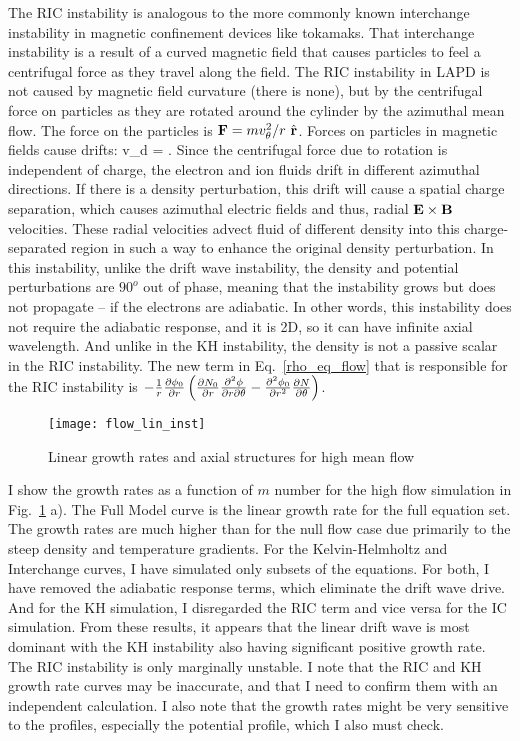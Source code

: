 The RIC instability is analogous to the more commonly known interchange instability in magnetic confinement devices like tokamaks. That interchange instability is a result of a curved magnetic
field that causes particles to feel a centrifugal force as they travel along the field. The RIC instability in LAPD is not caused by magnetic field curvature (there is none), but by the
centrifugal force on particles as they are rotated around the cylinder by the azimuthal mean flow. 
The force on the particles is ${\bf F} = m v_\theta^2/r \ \hat{{\bf r}}$. Forces on particles in magnetic fields cause drifts:
\beq
\label{force_drift}
v_d =  .
\eeq
Since the centrifugal force due to rotation is independent of charge, the electron and ion fluids drift in different azimuthal directions. If there is a density perturbation, this drift will cause
a spatial charge separation, which causes azimuthal electric fields and thus, radial ${\bf E \times B}$ velocities. 
These radial velocities advect fluid of different density into this charge-separated region in such a way to enhance the original density perturbation. In this instability, unlike the drift wave
instability, the density and potential perturbations are $90^o$ out of phase, meaning that the instability grows but does not propagate -- if the electrons are adiabatic. In other words,
this instability does not require the adiabatic response, and it is 2D, so it can have infinite axial wavelength. And unlike in the KH instability, the density is not a passive scalar in the
RIC instability. The new term in Eq.~\ref{rho_eq_flow} that is responsible
for the RIC instability is $-\frac{1}{r} \frac{\partial\phi_0}{\partial r} \left(\frac{\partial N_0}{\partial r} \frac{\partial^2\phi}{\partial r \partial\theta} - \frac{\partial^2\phi_0}{\partial r^2} \frac{\partial N}{\partial\theta} \right)$.

\begin{figure}
\centerline{\texttt{[image: flow\_lin\_inst]}}
\caption{Linear growth rates and axial structures for high mean flow}
\label{flow_lin_inst}
\end{figure}

I show the growth rates as a function of $m$ number for the high flow simulation in Fig.~\ref{flow_lin_inst} a). The Full Model curve is the linear growth rate
for the full equation set. The growth rates are much higher than for the null flow case due primarily to the steep density and temperature gradients. For the Kelvin-Helmholtz and Interchange
curves, I have simulated only subsets of the equations. For both, I have removed the adiabatic response terms, which eliminate the drift wave drive. And for the KH simulation, I disregarded
the RIC term and vice versa for the IC simulation. From these results, it appears that the linear drift wave is most dominant with the KH instability also having significant positive growth
rate. The RIC instability is only marginally unstable. I note that the RIC and KH growth rate curves may be inaccurate, and that I need to confirm them with an independent calculation.
I also note that the growth rates might be very sensitive to the profiles, especially the potential profile, which I also must check.

